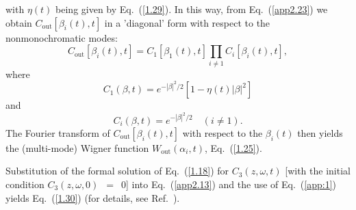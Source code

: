 \documentclass[pra, twocolumn]{revtex4}
\begin{document}
with $\eta(t)$ being given by Eq.~(\ref{1.29}).
In this way, from Eq.~(\ref{app2.23}) we obtain
$C_{\mathrm{out}}[\beta_i(t),t]$ in a 'diagonal' form
with respect to the nonmonochromatic modes:
\begin{equation}
  \label{app2.27}
C_\mathrm{out}[\beta_i(t),t]
= C_1[\beta_1(t),t]\prod_{i\neq1} C_i[\beta_i(t),t],
\end{equation}
where
\begin{equation}
  \label{app2.29}
 C_1(\beta,t) = e^{-|\beta|^2/2}
\left[1-\eta(t)|\beta|^2\right]
\end{equation}
and
\begin{equation}
  \label{5.21-3}
 C_i(\beta,t) = e^{-|\beta|^2/2} \quad (i\neq 1).
\end{equation}
The Fourier transform of $C_\mathrm{out}[\beta_i(t),t]$
with respect to the $\beta_i(t)$ then yields the (multi-mode)
Wigner function $W_{\mathrm{out}}(\alpha_i,t)$, Eq.~(\ref{1.25}).

Substitution of the formal solution of Eq.~(\ref{1.18}) for
$C_3(z, \omega, t)$
[with the initial condition 
\mbox{$C_3(z, \omega, 0)$ $\!=$ $\!0$}] into Eq.~(\ref{app2.13}) and
the use of Eq.~(\ref{app:1}) yields Eq.~(\ref{1.30}) 
(for details, see Ref.~\cite{khanbekyan:013822}).



%
\end{document}
